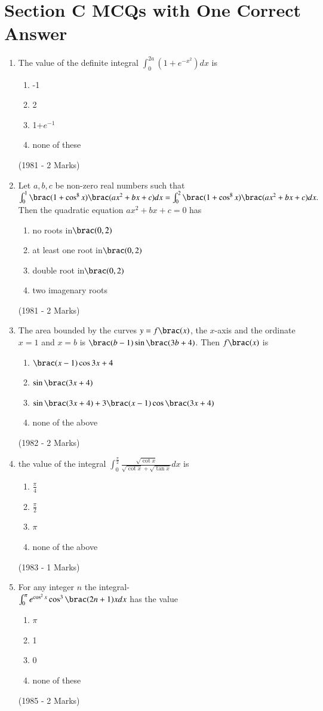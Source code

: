 \documentclass[journal,12pt,twocolumn]{IEEEtran}
\theoremstyle{remark}
\begin{document}
\section{Section C MCQs with One Correct Answer}
\begin{enumerate}
	\item The value of the definite integral $\int_0^{2a}(1+e^{-x^2})dx$ is\\
		\begin{enumerate}
	\item -1            
	\item  2
	\item  1+$e^{-1}$     
	\item  none of these
		\end{enumerate}
		\hfill{\brac(1981 - 2 Marks)}
	\item Let $a,b,c$ be non-zero real numbers such that $\int_0^1 \brac(1+ \cos ^8 x)\brac(ax^2 + bx +c)dx = \int_0^2 \brac(1+ \cos^8 x)\brac(ax^2+bx+c)dx.$\\
		Then the quadratic equation $ax^2+bx+c=0$ has
		
		\begin{enumerate}
	\item no roots in$ \brac(0,2)$
	\item at least one root in$ \brac(0,2)$
	\item double root in$ \brac(0,2)  $
	\item two imagenary roots
\end{enumerate}
		\hfill{\brac(1981 - 2 Marks)}
	\item The area bounded by the curves $y=f\brac(x)$, the $x$-axis and the ordinate $x=1$ and $x=b$ is $\brac(b-1) \sin \brac(3b+4)$. Then $f\brac(x)$ is 

		
		\begin{enumerate}
			\item$\brac(x-1) \cos {3x+4}$
			\item$\sin {\brac(3x+4)}$
			\item$\sin {\brac(3x+4)}+3\brac(x-1) \cos {\brac(3x+4)}$
			\item none of the above
		\end{enumerate}
		\hfill{\brac(1982 - 2 Marks)}
	\item the value of the integral $\int_0^{\frac{\pi}{2}} \frac{\sqrt{\cot x}}{\sqrt{\cot x}+\sqrt{\tan x}}dx$ is 

		\begin{enumerate}
			\item $\frac{\pi}{4}$
		\item$\frac{\pi}{2}$
			\item$\pi$
		\item none of the above
		\end{enumerate}
		\hfill{\brac(1983 - 1 Marks)}
	\item For any integer $n$ the integral-\\
		$\int_0^{\pi} e^{\cos^2 x} \cos ^3 {\brac(2n+1)}xdx$ has the value

		\begin{enumerate}
			\item	$\pi$
			\item 1
			\item 0
			\item none of these
		\end{enumerate}
		\hfill{\brac(1985 - 2 Marks)}
\end{enumerate}

    
\end{document}
